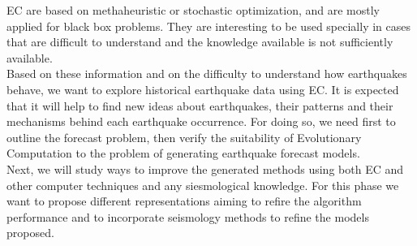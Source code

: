 EC are based on methaheuristic or stochastic optimization, and are mostly applied for black box problems. They are interesting to be used specially in cases that are difficult to understand and the knowledge available is not sufficiently available.\\

Based on these information and on the difficulty to understand how earthquakes behave, we want to explore historical earthquake data using EC. It is expected that it will help to find new ideas about earthquakes, their patterns and their mechanisms behind each earthquake occurrence. For doing so, we need first to outline the forecast problem, then verify the suitability of Evolutionary Computation to the problem of generating earthquake forecast models.\\

Next, we will study ways to improve the generated methods using both EC and other computer techniques and any siesmological knowledge. For this phase we want to propose different representations aiming to refire the algorithm performance and to incorporate seismology methods to refine the models proposed.\\


%
%
